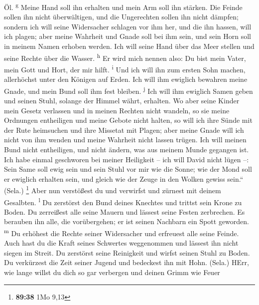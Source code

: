 Öl. \textsuperscript{g}  Meine Hand soll ihn erhalten und
mein Arm soll ihn stärken.  Die Feinde sollen ihn nicht
überwältigen, und die Ungerechten sollen ihn nicht dämpfen;
 sondern ich will seine Widersacher schlagen vor ihm her,
und die ihn hassen, will ich plagen;  aber meine Wahrheit
und Gnade soll bei ihm sein, und sein Horn soll in meinem Namen erhoben
werden.  Ich will seine Hand über das Meer stellen und
seine Rechte über die Wasser. \textsuperscript{h}  Er
wird mich nennen also: Du bist mein Vater, mein Gott und Hort, der mir
hilft. \textsuperscript{i}  Und ich will ihn zum ersten
Sohn machen, allerhöchst unter den Königen auf Erden. 
Ich will ihm ewiglich bewahren meine Gnade, und mein Bund soll ihm fest
bleiben. \textsuperscript{j}  Ich will ihm ewiglich Samen
geben und seinen Stuhl, solange der Himmel währt, erhalten.
 Wo aber seine Kinder mein Gesetz verlassen und in meinen
Rechten nicht wandeln,  so sie meine Ordnungen
entheiligen und meine Gebote nicht halten,  so will ich
ihre Sünde mit der Rute heimsuchen und ihre Missetat mit Plagen;
 aber meine Gnade will ich nicht von ihm wenden und meine
Wahrheit nicht lassen trügen.  Ich will meinen Bund nicht
entheiligen, und nicht ändern, was aus meinem Munde gegangen ist.
 Ich habe einmal geschworen bei meiner Heiligkeit -- ich
will David nicht lügen --:  Sein Same soll ewig sein und
sein Stuhl vor mir wie die Sonne;  wie der Mond soll er
ewiglich erhalten sein, und gleich wie der Zeuge in den Wolken gewiss
sein.`` (Sela.) \footnote{\textbf{89:38} 1Mo 9,13}  Aber
nun verstößest du und verwirfst und zürnest mit deinem Gesalbten.
\textsuperscript{l}  Du zerstörst den Bund deines
Knechtes und trittst sein Krone zu Boden.  Du zerreißest
alle seine Mauern und lässest seine Festen zerbrechen. 
Es berauben ihn alle, die vorübergehen; er ist seinen Nachbarn ein Spott
geworden. \textsuperscript{m}  Du erhöhest die Rechte
seiner Widersacher und erfreuest alle seine Feinde.  Auch
hast du die Kraft seines Schwertes weggenommen und lässest ihn nicht
siegen im Streit.  Du zerstörst seine Reinigkeit und
wirfst seinen Stuhl zu Boden.  Du verkürzest die Zeit
seiner Jugend und bedeckest ihn mit Hohn. (Sela.)  HErr,
wie lange willst du dich so gar verbergen und deinen Grimm wie Feuer
